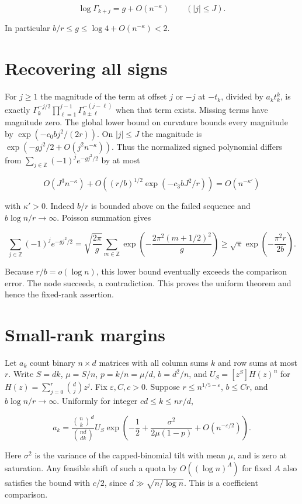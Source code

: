 \documentclass[11pt]{article}
\begin{document}
\[
\log\Gamma_{k+j}=g+O(n^{-\kappa})\qquad(|j|\le J).
\]

In particular $b/r\le g\le\log4+O(n^{-\kappa})<2$.

\section{Recovering all signs}

For $j\ge1$ the magnitude of the term at offset $j$ or $-j$ at $-t_k$, divided by $a_k t_k^k$, is exactly $\Gamma_k^{-j/2}\prod_{\ell=1}^{j-1}\Gamma_{k\pm\ell}^{-(j-\ell)}$ when that term exists. Missing terms have magnitude zero. The global lower bound on curvature bounds every magnitude by $\exp(-c_0bj^2/(2r))$. On $|j|\le J$ the magnitude is $\exp(-gj^2/2+O(j^2n^{-\kappa}))$. Thus the normalized signed polynomial differs from $\sum_{j\in\mathbb Z}(-1)^j e^{-g j^2/2}$ by at most

\[
O(J^3n^{-\kappa})+
O\left((r/b)^{1/2}\exp(-c_3 bJ^2/r)\right)=O(n^{-\kappa'})
\]

with $\kappa'>0$. Indeed $b/r$ is bounded above on the failed sequence and $b\log n/r\to\infty$. Poisson summation gives

\[
\sum_{j\in\mathbb Z}(-1)^j e^{-g j^2/2}
=\sqrt{\frac{2\pi}{g}}\sum_{m\in\mathbb Z}
\exp\left(-\frac{2\pi^2(m+1/2)^2}{g}\right)
\ge\sqrt\pi\exp\left(-\frac{\pi^2r}{2b}\right).
\]

Because $r/b=o(\log n)$, this lower bound eventually exceeds the comparison error. The node succeeds, a contradiction. This proves the uniform theorem and hence the fixed-rank assertion.

\appendix
\section{Small-rank margins}
\label{app:gmw}

Let $a_k$ count binary $n\times d$ matrices with all column sums $k$ and row sums at most $r$. Write $S=dk$, $\mu=S/n$, $p=k/n=\mu/d$, $b=d^2/n$, and $U_S=[z^S]H(z)^n$ for $H(z)=\sum_{j=0}^r\binom dj z^j$. Fix $\varepsilon,C,c>0$. Suppose $r\le n^{1/5-\varepsilon}$, $b\le Cr$, and $b\log n/r\to\infty$. Uniformly for integer $cd\le k\le nr/d$,

\[
a_k=\frac{\binom nk^d}{\binom{nd}{dk}}U_S
\exp\left(-\frac12+\frac{\sigma^2}{2\mu(1-p)}
+O(n^{-\varepsilon/2})\right).
\]

Here $\sigma^2$ is the variance of the capped-binomial tilt with mean $\mu$, and is zero at saturation. Any feasible shift of such a quota by $O((\log n)^A)$ for fixed $A$ also satisfies the bound with $c/2$, since $d\gg\sqrt{n/\log n}$. This is a coefficient comparison.
\end{document}
